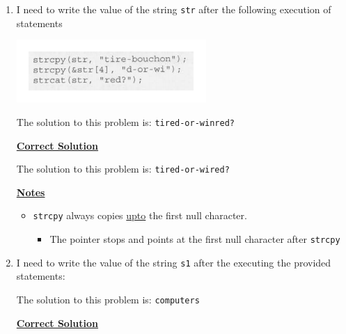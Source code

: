 \documentclass[12pt]{article}
\begin{document}
\begin{enumerate}[1.]
    \item

    I need to write the value of the string \texttt{str} after the following execution
    of statements

    \begin{center}
    \includegraphics[width=0.5\linewidth]{images/review_6_solution_5.png}
    \end{center}

    The solution to this problem is: \texttt{tired-or-winred?}

    \bigskip

    \begin{mdframed}
    \underline{\textbf{Correct Solution}}

    \bigskip

    The solution to this problem is: \texttt{tired-or-wired?}
    \end{mdframed}

    \bigskip

    \underline{\textbf{Notes}}

    \bigskip

    \begin{itemize}
        \item \texttt{strcpy} always copies \underline{upto} the first null character.

        \begin{itemize}
            \item The pointer stops and points at the first null character after \texttt{strcpy}
        \end{itemize}
    \end{itemize}

    \item

    I need to write the value of the string \texttt{s1} after the executing the provided statements:

    \bigskip

    The solution to this problem is: \texttt{computers}

    \bigskip

    \begin{mdframed}
    \underline{\textbf{Correct Solution}}


\end{mdframed}
\end{enumerate}
\end{document}
